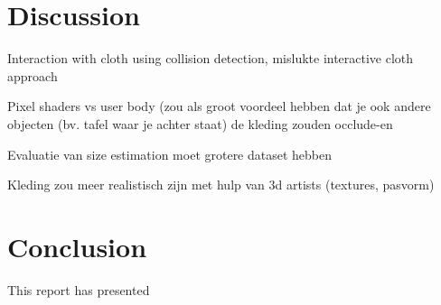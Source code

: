 \documentclass[a4paper]{article}
\begin{document}
\section{Discussion}
\label{sec:discussion}

Interaction with cloth using collision detection, mislukte interactive cloth approach

Pixel shaders vs user body (zou als groot voordeel hebben dat je ook andere objecten (bv. tafel waar je achter staat) de kleding zouden occlude-en

Evaluatie van size estimation moet grotere dataset hebben

Kleding zou meer realistisch zijn met hulp van 3d artists (textures, pasvorm)

\section{Conclusion}
\label{sec:conclusion}

This report has presented 
\end{document}
